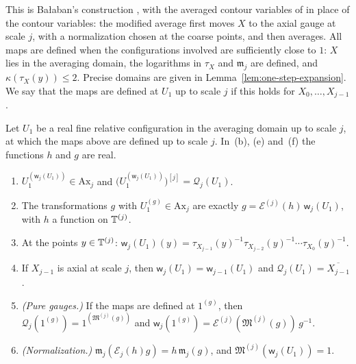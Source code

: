 This is Ba\l aban's construction \cite[(58)--(63), (88)--(92)]{BalAvg}, with the averaged contour variables of \cite[(0.11)]{BalYM4I} in place of the contour variables: the modified average first moves $X$ to the axial gauge at scale $j$, with a normalization chosen at the coarse points, and then averages. All maps are defined when the configurations involved are sufficiently close to $1$: $X$ lies in the averaging domain, the logarithms in $\tau_X$ and $\mathfrak m_j$ are defined, and $\kappa(\tau_X(y))\le2$. Precise domains are given in Lemma~\ref{lem:one-step-expansion}. We say that the maps are defined at $U_1$ up to scale $j$ if this holds for $X_0,\dots,X_{j-1}$.

\begin{theorem}[Correspondence]\label{thm:correspondence}
Let $U_1$ be a real fine relative configuration in the averaging domain up to scale $j$, at which the maps above are defined up to scale $j$. In~(b), (e) and~(f) the functions $h$ and $g$ are real.
\begin{enumerate}[label=(\alph*)]
\item $U_1^{(\mathsf w_j(U_1))}\in\mathrm{Ax}_j$ and $\big(U_1^{(\mathsf w_j(U_1))}\big)^{[j]}=\mathcal Q_j(U_1)$.
\item The transformations $g$ with $U_1^{(g)}\in\mathrm{Ax}_j$ are exactly $g=\mathcal E^{(j)}(h)\,\mathsf w_j(U_1)$, with $h$ a function on $\mathbb T^{(j)}$.
\item At the points $y\in\mathbb T^{(j)}$: $\mathsf w_j(U_1)(y)=\tau_{X_{j-1}}(y)^{-1}\tau_{X_{j-2}}(y)^{-1}\cdots\tau_{X_0}(y)^{-1}$.
\item If $X_{j-1}$ is axial at scale $j$, then $\mathsf w_j(U_1)=\mathsf w_{j-1}(U_1)$ and $\mathcal Q_j(U_1)=\overline{X_{j-1}}$.
\item \emph{(Pure gauges.)} If the maps are defined at $1^{(g)}$, then $\mathcal Q_j(1^{(g)})=1^{(\mathfrak M^{(j)}(g))}$ and $\mathsf w_j(1^{(g)})=\mathcal E^{(j)}(\mathfrak M^{(j)}(g))\,g^{-1}$.
\item \emph{(Normalization.)} $\mathfrak m_j(\mathcal E_j(h)g)=h\,\mathfrak m_j(g)$, and $\mathfrak M^{(j)}(\mathsf w_j(U_1))=1$.
\end{enumerate}
\end{theorem}

